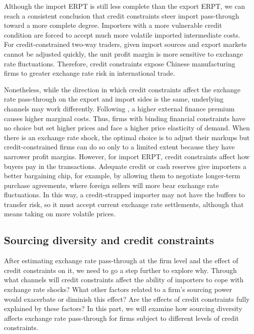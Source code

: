 \documentclass[12pt]{article}
\begin{document}
Although the import ERPT is still less complete than the export ERPT, we can reach a consistent conclusion that credit constraints steer import pass-through toward a more complete degree.  Importers with a more vulnerable credit condition are forced to accept much more volatile imported intermediate costs. For credit-constrained two-way traders, given import sources and export markets cannot be adjusted quickly, the unit profit margin is more sensitive to exchange rate fluctuations. Therefore, credit constraints expose Chinese manufacturing firms to greater exchange rate risk in international trade.

Nonetheless, while the direction in which credit constraints affect the exchange rate pass-through on the export and import sides is the same, underlying channels may work differently. Following \cite{strasser2013}, a higher external finance premium causes higher marginal costs. Thus, firms with binding financial constraints have no choice but set higher prices and face a higher price elasticity of demand. When there is an exchange rate shock, the optimal choice is to adjust their markups but credit-constrained firms can do so only to a limited extent because they have narrower profit margins. However, for import ERPT, credit constraints affect how buyers pay in the transactions. Adequate credit or cash reserves give importers a better bargaining chip, for example, by allowing them to negotiate longer-term purchase agreements, where foreign sellers will more bear exchange rate fluctuations. In this way, a credit-strapped importer may not have the buffers to transfer risk, so it must accept current exchange rate settlements, although that means taking on more volatile prices.

\subsection{Sourcing diversity and credit constraints}

After estimating exchange rate pass-through at the firm level and the effect of credit constraints on it, we need to go a step further to explore why. Through what channels will credit constraints affect the ability of importers to cope with exchange rate shocks? What other factors related to a firm's sourcing power would exacerbate or diminish this effect? Are the effects of credit constraints fully explained by these factors? In this part, we will examine how sourcing diversity affects exchange rate pass-through for firms subject to different levels of credit constraints.
\end{document}
